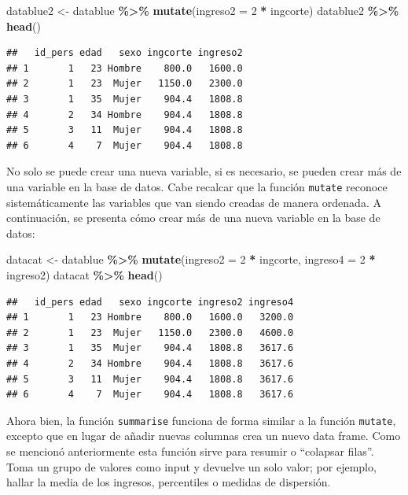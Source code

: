 \documentclass[
  spanish,
  12pt,
]{book}
\newenvironment{Shaded}{\begin{snugshade}}{\end{snugshade}}
\newcommand{\AttributeTok}[1]{\textcolor[rgb]{0.13,0.29,0.53}{#1}}
\newcommand{\DecValTok}[1]{\textcolor[rgb]{0.00,0.00,0.81}{#1}}
\newcommand{\FunctionTok}[1]{\textcolor[rgb]{0.13,0.29,0.53}{\textbf{#1}}}
\newcommand{\NormalTok}[1]{#1}
\newcommand{\OtherTok}[1]{\textcolor[rgb]{0.56,0.35,0.01}{#1}}
\newcommand{\SpecialCharTok}[1]{\textcolor[rgb]{0.81,0.36,0.00}{\textbf{#1}}}
\begin{document}
\begin{Shaded}
\begin{Highlighting}[]
\NormalTok{datablue2 }\OtherTok{\textless{}{-}}\NormalTok{ datablue }\SpecialCharTok{\%\textgreater{}\%} 
  \FunctionTok{mutate}\NormalTok{(}\AttributeTok{ingreso2 =} \DecValTok{2} \SpecialCharTok{*}\NormalTok{ ingcorte)}
\NormalTok{datablue2 }\SpecialCharTok{\%\textgreater{}\%} \FunctionTok{head}\NormalTok{()}
\end{Highlighting}
\end{Shaded}

\begin{verbatim}
##   id_pers edad   sexo ingcorte ingreso2
## 1       1   23 Hombre    800.0   1600.0
## 2       1   23  Mujer   1150.0   2300.0
## 3       1   35  Mujer    904.4   1808.8
## 4       2   34 Hombre    904.4   1808.8
## 5       3   11  Mujer    904.4   1808.8
## 6       4    7  Mujer    904.4   1808.8
\end{verbatim}

No solo se puede crear una nueva variable, si es necesario, se pueden crear más de una variable en la base de datos. Cabe recalcar que la función \texttt{mutate} reconoce sistemáticamente las variables que van siendo creadas de manera ordenada. A continuación, se presenta cómo crear más de una nueva variable en la base de datos:

\begin{Shaded}
\begin{Highlighting}[]
\NormalTok{datacat }\OtherTok{\textless{}{-}}\NormalTok{ datablue }\SpecialCharTok{\%\textgreater{}\%} 
  \FunctionTok{mutate}\NormalTok{(}\AttributeTok{ingreso2 =} \DecValTok{2} \SpecialCharTok{*}\NormalTok{ ingcorte,}
         \AttributeTok{ingreso4 =} \DecValTok{2} \SpecialCharTok{*}\NormalTok{ ingreso2)}
\NormalTok{datacat }\SpecialCharTok{\%\textgreater{}\%} \FunctionTok{head}\NormalTok{()}
\end{Highlighting}
\end{Shaded}

\begin{verbatim}
##   id_pers edad   sexo ingcorte ingreso2 ingreso4
## 1       1   23 Hombre    800.0   1600.0   3200.0
## 2       1   23  Mujer   1150.0   2300.0   4600.0
## 3       1   35  Mujer    904.4   1808.8   3617.6
## 4       2   34 Hombre    904.4   1808.8   3617.6
## 5       3   11  Mujer    904.4   1808.8   3617.6
## 6       4    7  Mujer    904.4   1808.8   3617.6
\end{verbatim}

Ahora bien, la función \texttt{summarise} funciona de forma similar a la función \texttt{mutate}, excepto que en lugar de añadir nuevas columnas crea un nuevo data frame. Como se mencionó anteriormente esta función sirve para resumir o ``colapsar filas''. Toma un grupo de valores como input y devuelve un solo valor; por ejemplo, hallar la media de los ingresos, percentiles o medidas de dispersión.
\end{document}
